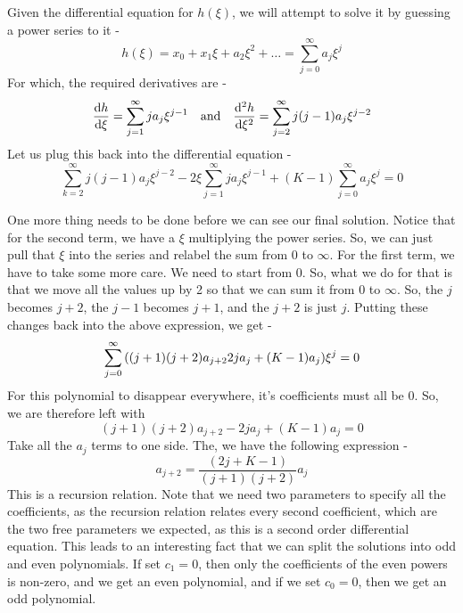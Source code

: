 Given the differential equation for $h(\xi)$, we will attempt to solve it by guessing a power series to it -
\begin{equation*}
  h(\xi)=x_0+x_1\xi+a_2\xi^2+\dots=\sum_{j=0}^{\infty}a_j\xi^j
\end{equation*}
For which, the required derivatives are -
\begin{equation*}
  \dv{h}{\xi}=\sum_{j=1}^{\infty}ja_j\xi^{j-1}\quad\text{and}\quad
  \dv[2]{h}{\xi}=\sum_{j=2}^{\infty}j(j-1)a_j\xi^{j-2}
\end{equation*}
Let us plug this back into the differential equation -
\begin{equation*}
  \sum_{k=2}^{\infty}j(j-1)a_j\xi^{j-2}-
  2\xi\sum_{j=1}^{\infty}ja_j\xi^{j-1}+
  (K-1)\sum_{j=0}^{\infty}a_j\xi^j=0
\end{equation*}

One more thing needs to be done before we can see our final solution. Notice that for the second term, we have a $\xi$ multiplying the power series. So, we can just pull that $\xi$ into the series and relabel the sum from $0$ to $\infty$. For the first term, we have to take some more care. We need to start from $0$. So, what we do for that is that we move all the values up by 2 so that we can sum it from $0$ to $\infty$. So, the $j$ becomes $j + 2$, the $j - 1$ becomes $j + 1$, and the $j + 2$ is just $j$. Putting these changes back into the above expression, we get - 
\begin{equation*}
  \sum_{j=0}^{\infty}\qty((j+1)(j+2)a_{j+2}2ja_j+(K-1)a_j)\xi^j=0
\end{equation*}
For this polynomial to disappear everywhere, it's coefficients must all be $0$. So, we are therefore left with
\begin{equation*}
  (j+1)(j+2)a_{j+2}-2ja_j+(K-1)a_j=0
\end{equation*}
Take all the $a_{j}$ terms to one side. The, we have the following expression -
\begin{equation}
  \label{eqn:fraction}
  a_{j+2}=\dfrac{(2j+K-1)}{(j+1)(j+2)}a_j
\end{equation}
This is a recursion relation. Note that we need two parameters to specify all the coefficients, as the recursion relation relates every second coefficient, which are the two free parameters we expected, as this is a second order differential equation. This leads to an interesting fact that we can split the solutions into odd and even polynomials. If set $c_{1} = 0$, then only the coefficients of the even powers is non-zero, and we get an even polynomial, and if we set $c_{0} = 0$, then we get an odd polynomial.
